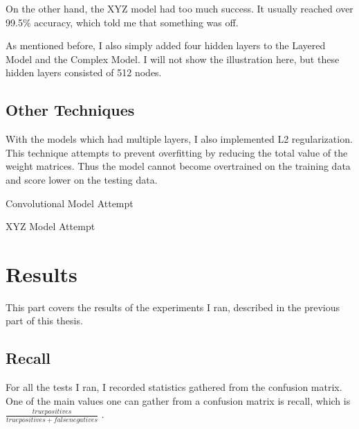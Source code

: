 \documentclass[]{report}
\begin{document}
On the other hand, the XYZ model had too much success. It usually reached over 99.5\% accuracy, which told me that something was off. 



As mentioned before, I also simply added four hidden layers to the Layered Model and the Complex Model. I will not show the illustration here, but these hidden layers consisted of 512 nodes. 

\section{Other Techniques}

With the models which had multiple layers, I also implemented L2 regularization. This technique attempts to prevent overfitting by reducing the total value of the weight matrices. Thus the model cannot become overtrained on the training data and score lower on the testing data.

Convolutional Model Attempt

XYZ Model Attempt

\chapter{Results}

This part covers the results of the experiments I ran, described in the previous part of this thesis.

\section{Recall}

For all the tests I ran, I recorded statistics gathered from the confusion matrix. One of the main values one can gather from a confusion matrix is recall, which is $\frac{truepositives}{truepositives + falsenegatives} $ \cite{ThreeGiants}.
\end{document}
